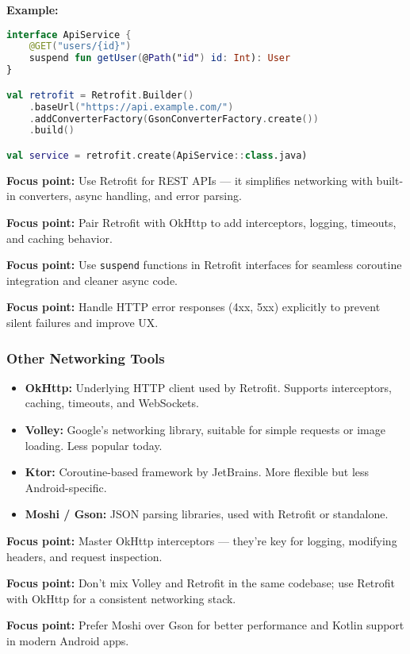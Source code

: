 \documentclass[a4paper,12pt]{article}
\begin{document}
\textbf{Example:}
\begin{lstlisting}[language=Kotlin]
interface ApiService {
    @GET("users/{id}")
    suspend fun getUser(@Path("id") id: Int): User
}

val retrofit = Retrofit.Builder()
    .baseUrl("https://api.example.com/")
    .addConverterFactory(GsonConverterFactory.create())
    .build()

val service = retrofit.create(ApiService::class.java)
\end{lstlisting}

\textbf{Focus point:} Use Retrofit for REST APIs — it simplifies networking with built-in converters, async handling, and error parsing.

\textbf{Focus point:} Pair Retrofit with OkHttp to add interceptors, logging, timeouts, and caching behavior.

\textbf{Focus point:} Use \texttt{suspend} functions in Retrofit interfaces for seamless coroutine integration and cleaner async code.

\textbf{Focus point:} Handle HTTP error responses (4xx, 5xx) explicitly to prevent silent failures and improve UX.

\subsubsection{Other Networking Tools}

\begin{itemize}
  \item \textbf{OkHttp:} Underlying HTTP client used by Retrofit. Supports interceptors, caching, timeouts, and WebSockets.
  \item \textbf{Volley:} Google’s networking library, suitable for simple requests or image loading. Less popular today.
  \item \textbf{Ktor:} Coroutine-based framework by JetBrains. More flexible but less Android-specific.
  \item \textbf{Moshi / Gson:} JSON parsing libraries, used with Retrofit or standalone.
\end{itemize}

\textbf{Focus point:} Master OkHttp interceptors — they're key for logging, modifying headers, and request inspection.

\textbf{Focus point:} Don’t mix Volley and Retrofit in the same codebase; use Retrofit with OkHttp for a consistent networking stack.

\textbf{Focus point:} Prefer Moshi over Gson for better performance and Kotlin support in modern Android apps.
\end{document}
